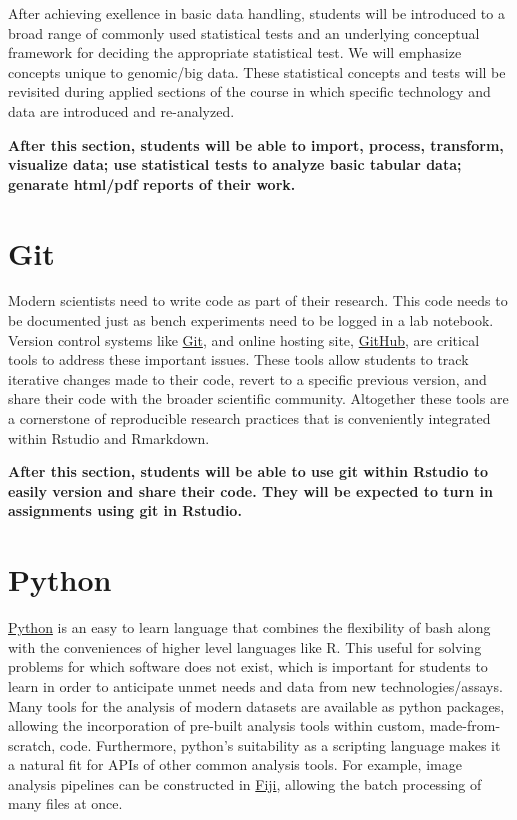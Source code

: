 \documentclass[]{book}
\begin{document}
After achieving exellence in basic data handling, students will be
introduced to a broad range of commonly used statistical tests and an
underlying conceptual framework for deciding the appropriate statistical
test. We will emphasize concepts unique to genomic/big data. These
statistical concepts and tests will be revisited during applied sections
of the course in which specific technology and data are introduced and
re-analyzed.

\textbf{After this section, students will be able to import, process,
transform, visualize data; use statistical tests to analyze basic
tabular data; genarate html/pdf reports of their work.}

\section{Git}\label{git}

Modern scientists need to write code as part of their research. This
code needs to be documented just as bench experiments need to be logged
in a lab notebook. Version control systems like
\href{https://git-scm.com}{Git}, and online hosting site,
\href{https://github.com}{GitHub}, are critical tools to address these
important issues. These tools allow students to track iterative changes
made to their code, revert to a specific previous version, and share
their code with the broader scientific community. Altogether these tools
are a cornerstone of reproducible research practices that is
conveniently integrated within Rstudio and Rmarkdown.

\textbf{After this section, students will be able to use git within
Rstudio to easily version and share their code. They will be expected to
turn in assignments using git in Rstudio.}

\section{Python}\label{python}

\href{https://www.python.org/}{Python} is an easy to learn language that
combines the flexibility of bash along with the conveniences of higher
level languages like R. This useful for solving problems for which
software does not exist, which is important for students to learn in
order to anticipate unmet needs and data from new technologies/assays.
Many tools for the analysis of modern datasets are available as python
packages, allowing the incorporation of pre-built analysis tools within
custom, made-from-scratch, code. Furthermore, python's suitability as a
scripting language makes it a natural fit for APIs of other common
analysis tools. For example, image analysis pipelines can be constructed
in \href{https://imagej.net/Jython_Scripting}{Fiji}, allowing the batch
processing of many files at once.
\end{document}
